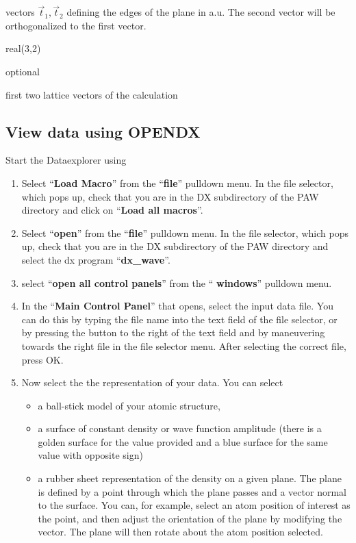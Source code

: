\documentclass[final,12pt,makeidx,DIV=calc]{article}
\newcommand{\key}[1]{\hfill\break \makebox[1.5in][l]{\bf #1}\hfill\break}
\newcommand{\vdescr}[1]{\makebox[1in][l]{}\parbox[t]{110mm}{#1}\hfill\break}
\newcommand{\vformat}[1]{
\makebox[1in][l]{}\parbox[t]{110mm}{\makebox[1in][l]{Type:}\parbox[t]{2.7in}{#1}}
\hfill\break}
\newcommand{\vrules}[1]{
\makebox[1in][l]{}\parbox[t]{110mm}{\makebox[1in][l]{Rules:}\parbox[t]{2.7in}{#1}}
\hfill\break}
\newcommand{\vdefault}[1]{
\makebox[1in][l]{}\parbox[t]{110mm}
{\makebox[1in][l]{Default:}\parbox[t]{2.7in}{#1}}
\hfill\break}
\newcommand{\mbax}[1]{#1}
\begin{document}
{{{{{{\mbax{\key{T}
\vdescr{vectors $\vec{t}_1, \vec{t}_2$ defining the edges of the plane
  in a.u.  The second vector will be orthogonalized to the first
  vector.}
\vformat{real(3,2)} 
\vrules{optional}
\vdefault{first two lattice vectors of the calculation}}

\subsection{View data using OPENDX\cite{opendx}}
Start the Dataexplorer using

\bigskip{}\bigskip

\begin{enumerate}
\item Select ``{\bf Load Macro}'' from the ``{\bf file}'' pulldown
  menu. In the file selector, which pops up, check that you are in
  the DX subdirectory of the PAW directory and click on ``{\bf Load
    all macros}''.
\item Select ``{\bf open}'' from the ``{\bf file}'' pulldown menu. In the file
  selector, which pops up, check that you are in the DX subdirectory of the
  PAW directory and select the dx program ``{\bf dx\_wave}''.
\item select ``{\bf open all control panels}'' from the ``{\bf
    windows}'' pulldown menu.
\item In the ``{\bf Main Control Panel}'' that opens, select the input
  data file. You can do this by typing the file name into the text
  field of the file selector, or by pressing the button to the right of
  the text field and by maneuvering towards the right file in the
  file selector menu. After selecting the correct file, press OK.
\item Now select the the representation of your data. You can select 
\begin{itemize} 
\item a ball-stick model of your atomic structure,
\item a surface of constant density or wave function amplitude (there
  is a golden surface for the value provided and a blue surface for
  the same value with opposite sign)
\item a rubber sheet representation of the density on a given
  plane. The plane is defined by a point through which the plane
  passes and a vector normal to the surface. You can, for example,
  select an atom position of interest as the point, and then adjust
  the orientation of the plane by modifying the vector. The plane will
  then rotate about the atom position selected.


\end{itemize}
\end{enumerate}}}}}}}
\end{document}
